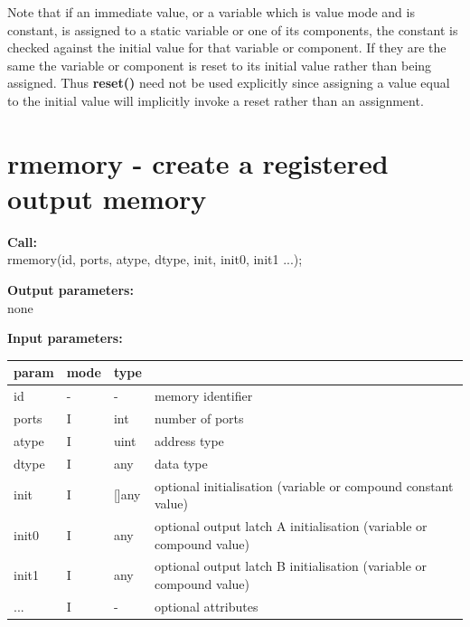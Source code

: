         Note that if an immediate value, or a variable which is value mode
        and is constant, is assigned to a static variable or one of its
        components, the constant is checked against the initial value for
        that variable or component. If they are the same the variable or
        component is reset to its initial value rather than being assigned.
        Thus {\bf reset()} need not be used explicitly since assigning a value
        equal to the initial value will implicitly invoke a reset rather than
        an assignment.



    \section{rmemory - create a registered output memory}\label{sec:iprmemory}
        
        {\bf Call:} \\
        rmemory(id, ports, atype, dtype, init, init0, init1 ...);
        
        {\bf Output parameters:} \\
        none
        
        {\bf Input parameters:} \\
        \begin{tabular}{| l | l | l | l |}
        \hline
        param  & mode       & type  & \\
        \hline \hline
        id     & - &  -           & memory identifier         \\ \hline
        ports  & I & int          & number of ports           \\ \hline
        atype  & I & uint         & address type              \\ \hline
        dtype  & I & any          & data type                 \\ \hline
        init   & I & []any        & optional initialisation (variable or compound
                                    constant value)                    \\ \hline
        init0  & I & any          & optional output latch A initialisation
                                    (variable or compound value)  \\ \hline
        init1  & I & any          & optional output latch B initialisation
                                    (variable or compound value)  \\ \hline
        ...    & I &  -           & optional attributes       \\ \hline
        \end{tabular}
        
